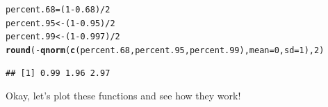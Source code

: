 \documentclass{tufte-handout}\usepackage[]{graphicx}\usepackage[]{color}
\makeatletter
\newcommand{\hlnum}[1]{\textcolor[rgb]{0.686,0.059,0.569}{#1}}%
\newcommand{\hlopt}[1]{\textcolor[rgb]{0,0,0}{#1}}%
\newcommand{\hlstd}[1]{\textcolor[rgb]{0.345,0.345,0.345}{#1}}%
\newcommand{\hlkwb}[1]{\textcolor[rgb]{0.69,0.353,0.396}{#1}}%
\newcommand{\hlkwc}[1]{\textcolor[rgb]{0.333,0.667,0.333}{#1}}%
\newcommand{\hlkwd}[1]{\textcolor[rgb]{0.737,0.353,0.396}{\textbf{#1}}}%
\newenvironment{kframe}{%
 \def\at@end@of@kframe{}%
 \ifinner\ifhmode%
  \def\at@end@of@kframe{\end{minipage}}%
  \begin{minipage}{\columnwidth}%
 \fi\fi%
 \def\FrameCommand##1{\hskip\@totalleftmargin \hskip-\fboxsep
 \colorbox{shadecolor}{##1}\hskip-\fboxsep
     \hskip-\linewidth \hskip-\@totalleftmargin \hskip\columnwidth}%
 \MakeFramed {\advance\hsize-\width
   \@totalleftmargin\z@ \linewidth\hsize
   \@setminipage}}%
 {\par\unskip\endMakeFramed%
 \at@end@of@kframe}
\newenvironment{knitrout}{}{} %
\makeatother
\begin{document}
\begin{knitrout}
\color{fgcolor}\begin{kframe}
\begin{alltt}
\hlstd{percent.68} \hlkwb{=} \hlstd{(}\hlnum{1} \hlopt{-} \hlnum{0.68}\hlstd{)}\hlopt{/}\hlnum{2}
\hlstd{percent.95} \hlkwb{<-} \hlstd{(}\hlnum{1} \hlopt{-} \hlnum{0.95}\hlstd{)}\hlopt{/}\hlnum{2}
\hlstd{percent.99} \hlkwb{<-} \hlstd{(}\hlnum{1} \hlopt{-} \hlnum{0.997}\hlstd{)}\hlopt{/}\hlnum{2}
\hlkwd{round}\hlstd{(}\hlopt{-}\hlkwd{qnorm}\hlstd{(}\hlkwd{c}\hlstd{(percent.68, percent.95, percent.99),} \hlkwc{mean}\hlstd{=}\hlnum{0}\hlstd{,} \hlkwc{sd}\hlstd{=}\hlnum{1}\hlstd{),} \hlnum{2}\hlstd{)}
\end{alltt}
\begin{verbatim}
## [1] 0.99 1.96 2.97
\end{verbatim}
\end{kframe}
\end{knitrout}

Okay, let's plot these functions and see how they work!
\end{document}
